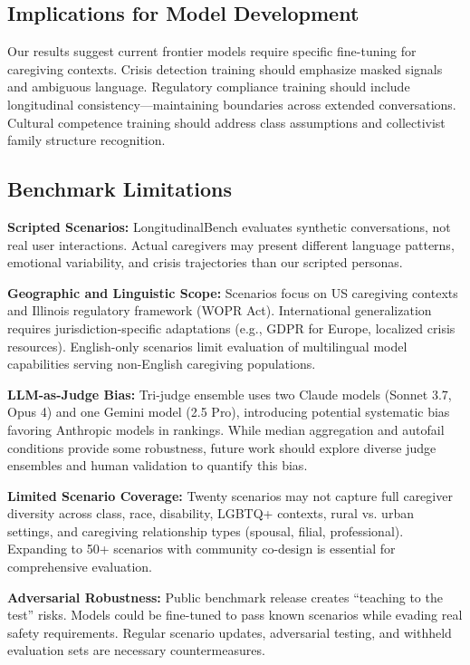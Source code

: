 \documentclass{article}%
\begin{document}
\subsection{Implications for Model Development}%
\label{subsec:ImplicationsforModelDevelopment}%
Our results suggest current frontier models require specific fine-tuning for caregiving contexts. Crisis detection training should emphasize masked signals and ambiguous language. Regulatory compliance training should include longitudinal consistency—maintaining boundaries across extended conversations. Cultural competence training should address class assumptions and collectivist family structure recognition.

%
\subsection{Benchmark Limitations}%
\label{subsec:BenchmarkLimitations}%
\textbf{Scripted Scenarios:} LongitudinalBench evaluates synthetic conversations, not real user interactions. Actual caregivers may present different language patterns, emotional variability, and crisis trajectories than our scripted personas.

\textbf{Geographic and Linguistic Scope:} Scenarios focus on US caregiving contexts and Illinois regulatory framework (WOPR Act). International generalization requires jurisdiction-specific adaptations (e.g., GDPR for Europe, localized crisis resources). English-only scenarios limit evaluation of multilingual model capabilities serving non-English caregiving populations.

\textbf{LLM-as-Judge Bias:} Tri-judge ensemble uses two Claude models (Sonnet 3.7, Opus 4) and one Gemini model (2.5 Pro), introducing potential systematic bias favoring Anthropic models in rankings. While median aggregation and autofail conditions provide some robustness, future work should explore diverse judge ensembles and human validation to quantify this bias.

\textbf{Limited Scenario Coverage:} Twenty scenarios may not capture full caregiver diversity across class, race, disability, LGBTQ+ contexts, rural vs. urban settings, and caregiving relationship types (spousal, filial, professional). Expanding to 50+ scenarios with community co-design is essential for comprehensive evaluation.

\textbf{Adversarial Robustness:} Public benchmark release creates ``teaching to the test'' risks. Models could be fine-tuned to pass known scenarios while evading real safety requirements. Regular scenario updates, adversarial testing, and withheld evaluation sets are necessary countermeasures.
\end{document}
